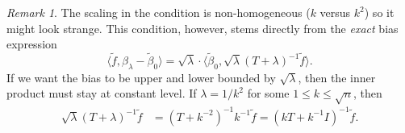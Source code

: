 \documentclass[11pt,a4paper]{article}
\renewcommand{\tilde}{\widetilde}
\theoremstyle{definition}
\theoremstyle{plain}
\theoremstyle{remark}
\newtheorem{remark}{Remark}[section]
\begin{document}
\begin{remark}
The scaling in the condition is non-homogeneous ($k$ versus $k^2$) so it might look strange. This condition, however, stems directly from the \emph{exact} bias expression
$$
\langle\tilde f, \beta_\lambda-\tilde\beta_0\rangle = \sqrt{\lambda}\cdot \langle \tilde\beta_0,\sqrt{\lambda}(T+\lambda)^{-1}\tilde f\rangle.
$$
If we want the bias to be upper and lower bounded by $\sqrt{\lambda}$, then the inner product must stay at constant level. If $\lambda=1/k^2$ for some $1\leq k\leq \sqrt{n}$, then
\begin{align*}
\sqrt{\lambda}(T+\lambda)^{-1}\tilde f &= (T+k^{-2})^{-1} k^{-1} \tilde f = (kT+k^{-1}I)^{-1} \tilde f.
\end{align*}
\end{remark}



\end{document}
